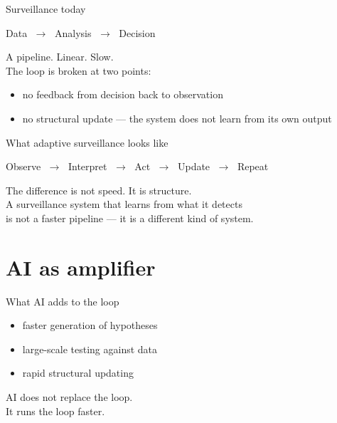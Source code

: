\documentclass[aspectratio=169, 10pt]{beamer}
\begin{document}
\begin{frame}{Surveillance today}
  \begin{block}{}
    \centering
    Data $\;\rightarrow\;$ Analysis $\;\rightarrow\;$ Decision
  \end{block}

  \bigskip
  A pipeline. Linear. Slow.\\[0.5em]

  The loop is broken at two points:
  \begin{itemize}
    \item no feedback from decision back to observation
    \item no structural update — the system does not learn from its own output
  \end{itemize}
\end{frame}

\begin{frame}{What adaptive surveillance looks like}
  \begin{alertblock}{}
    \centering\large
    Observe $\;\rightarrow\;$ Interpret $\;\rightarrow\;$ Act
    $\;\rightarrow\;$ Update $\;\rightarrow\;$ Repeat
  \end{alertblock}

  \bigskip
  The difference is not speed. It is structure.\\[0.5em]
  A surveillance system that learns from what it detects\\
  is not a faster pipeline — it is a different kind of system.
\end{frame}

\section{AI as amplifier}

\begin{frame}{What AI adds to the loop}
  \begin{itemize}
    \item faster generation of hypotheses
    \item large-scale testing against data
    \item rapid structural updating
  \end{itemize}

  \bigskip
  \begin{alertblock}{}
    \centering
    AI does not replace the loop.\\
    It runs the loop faster.
  \end{alertblock}
\end{frame}
\end{document}
